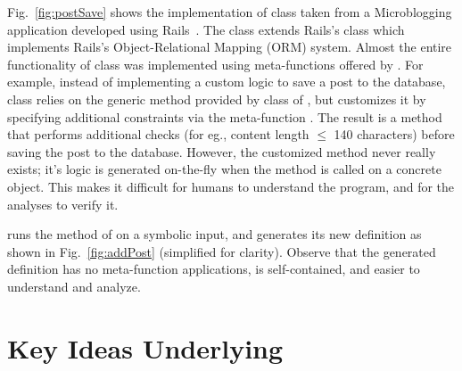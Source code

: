 Fig.~\ref{fig:postSave} shows the implementation of 
class taken from a Microblogging application developed using
Rails~\cite{sampleapp}. The class extends Rails's
 class which implements Rails's
Object-Relational Mapping (ORM) system. Almost the entire
functionality of  class was implemented using
meta-functions offered by . For example, instead
of implementing a custom logic to save a post to the database,
 class relies on the generic  method provided
by class of , but customizes it by specifying
additional constraints via the meta-function . The result
is a  method that performs additional checks (for eg., content
length $\le$ 140 characters) before saving the post to the database.
However, the customized  method never really exists; it's
logic is generated on-the-fly when the  method is called on a
concrete  object. This makes it difficult for humans to
understand the program, and for the analyses to verify it.

\name runs the  method of  on a symbolic input,
and generates its new definition as shown in Fig.~\ref{fig:addPost}
(simplified for clarity).  Observe that the generated definition has
no meta-function applications, is self-contained, and easier to
understand and analyze.

\section{Key Ideas Underlying \name}


